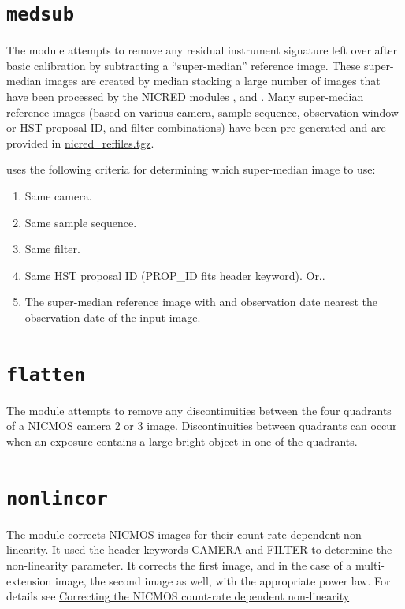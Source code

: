 \documentclass[letterpaper,10pt,english]{sphinxmanual}
\begin{document}
\section{\texttt{medsub}}
\label{modules:medsub}\label{modules:pyraf}
The  module attempts to remove any residual instrument signature left over after basic calibration
by subtracting a ``super-median'' reference image. These super-median images are created by median stacking a large
number of images that have been processed by the NICRED modules ,  and .
Many super-median reference images (based on various camera, sample-sequence, observation window or HST proposal ID,
and filter combinations) have been pre-generated and are provided in \href{http://www.firstgalaxies.org/downloads/nicred/nicred\_reffiles.tgz}{nicred\_reffiles.tgz}.

 uses the following criteria for determining which super-median image to use:
\begin{enumerate}
\item {} 
Same camera.

\item {} 
Same sample sequence.

\item {} 
Same filter.

\item {} 
Same HST proposal ID (PROP\_ID fits header keyword). Or..

\item {} 
The super-median reference image with and observation date nearest the observation date of the input image.

\end{enumerate}


\section{\texttt{flatten}}
\label{modules:flatten}
The  module attempts to remove any discontinuities between the four quadrants of a NICMOS camera 2 or 3 image.
Discontinuities between quadrants can occur when an exposure contains a large bright object in one of the quadrants.


\section{\texttt{nonlincor}}
\label{modules:index-6}\label{modules:nonlincor}
The  module corrects NICMOS images for their count-rate dependent
non-linearity. It used the header keywords CAMERA and FILTER to determine the
non-linearity parameter. It corrects the first image, and in the case of a
multi-extension image, the second image as well, with the appropriate power law.
For details see \href{http://www.stsci.edu/hst/nicmos/documents/isrs/isr\_2006\_003.pdf}{Correcting the NICMOS count-rate
dependent non-linearity}
\end{document}
